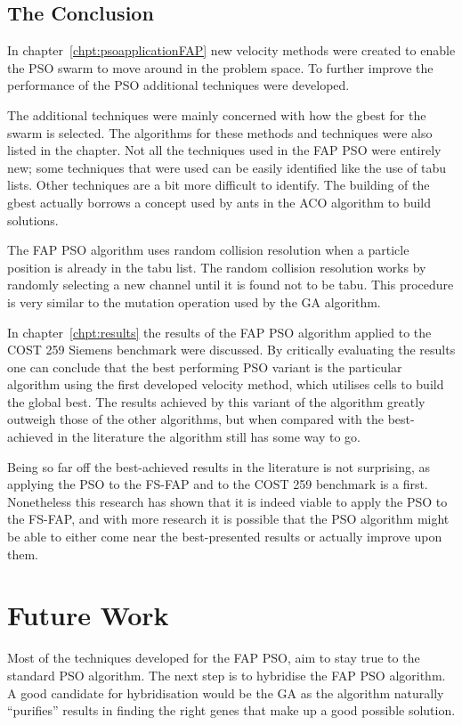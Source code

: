 \subsection{The Conclusion}
In chapter~\ref{chpt:psoapplicationFAP} new velocity methods were created to enable the PSO swarm to move around in the problem space. To further improve the performance of the PSO additional techniques were developed.

The additional techniques were mainly concerned with how the gbest for the swarm is selected. The algorithms for these methods and techniques were also listed in the chapter. Not all the techniques used in the FAP PSO were entirely new; some techniques that were used can be easily identified like the use of tabu lists. Other techniques are a bit more difficult to identify. The building of the gbest actually borrows a concept used by ants in the ACO algorithm to build solutions. 

The FAP PSO algorithm uses random collision resolution when a particle position is already in the tabu list. The random collision resolution works by randomly selecting a new channel until it is found not to be tabu. This procedure is very similar to the mutation operation used by the GA algorithm.

In chapter~\ref{chpt:results} the results of the FAP PSO algorithm applied to the COST 259 Siemens benchmark were discussed. By critically evaluating the results one can conclude that the best performing PSO variant is the particular algorithm using the first developed velocity method, which utilises cells to build the global best. The results achieved by this variant of the algorithm greatly outweigh those of the other algorithms, but when compared with the best-achieved in the literature the algorithm still has some way to go.

Being so far off the best-achieved results in the literature is not surprising, as applying the PSO to the FS-FAP and to the COST 259 benchmark is a first. Nonetheless this research has shown that it is indeed viable to apply the PSO to the FS-FAP, and with more research it is possible that the PSO algorithm might be able to either come near the best-presented results or actually improve upon them.

\section{Future Work}
Most of the techniques developed for the FAP PSO, aim to stay true to the standard PSO algorithm. The next step is to hybridise the FAP PSO algorithm. A good candidate for hybridisation would be the GA as the algorithm naturally ``purifies'' results in finding the right genes that make up a good possible solution.

